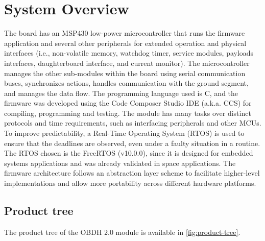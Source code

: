 %
%
%
%
%

%
%
%
%
%
%

\chapter{System Overview} \label{ch:system-overview}

The board has an MSP430 low-power microcontroller that runs the firmware application and several other peripherals for extended operation and physical interfaces (i.e., non-volatile memory, watchdog timer, service modules, payloads interfaces, daughterboard interface, and current monitor). The microcontroller manages the other sub-modules within the board using serial communication buses, synchronizes actions, handles communication with the ground segment, and manages the data flow. The programming language used is C, and the firmware was developed using the Code Composer Studio IDE (a.k.a. CCS) for compiling, programming and testing. The module has many tasks over distinct protocols and time requirements, such as interfacing peripherals and other MCUs. To improve predictability, a Real-Time Operating System (RTOS) is used to ensure that the deadlines are observed, even under a faulty situation in a routine. The RTOS chosen is the FreeRTOS (v10.0.0), since it is designed for embedded systems applications and was already validated in space applications. The firmware architecture follows an abstraction layer scheme to facilitate higher-level implementations and allow more portability across different hardware platforms.

\section{Product tree}

The product tree of the OBDH 2.0 module is available in \autoref{fig:product-tree}.

